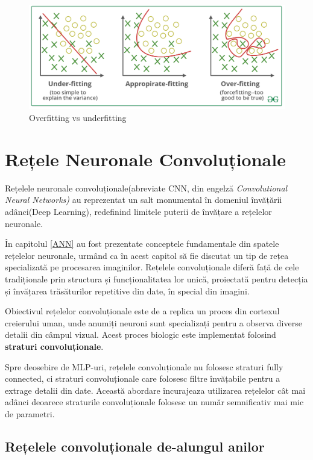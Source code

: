 \begin{figure}[h]
         \centering 
         \includegraphics[width=.85\linewidth]{images/under_vs_over.png}
         \captionsetup{font=footnotesize}
         \caption{Overfitting vs underfitting \cite{under_vs_over}}
\end{figure}


\newpage



\section{Rețele Neuronale Convoluționale}

Rețelele neuronale convoluționale(abreviate CNN, din engelză \textit{Convolutional Neural Networks)} au reprezentat un salt monumental în domeniul învățării adânci(Deep Learning), redefinind limitele puterii de învățare a rețelelor neuronale. 

În capitolul \ref{ANN} au fost prezentate conceptele fundamentale din spatele rețelelor neuronale, urmând ca în acest capitol să fie discutat un tip de rețea specializată pe procesarea imaginilor.
Rețelele convoluționale diferă față de cele tradiționale prin structura și funcționalitatea lor unică, proiectată pentru detecția și învățarea trăsăturilor repetitive din date, în special din imagini.

Obiectivul rețelelor convoluționale este de a replica un proces din cortexul creierului uman, unde anumiți neuroni sunt specializați pentru a observa diverse detalii din câmpul vizual. Acest proces biologic este implementat folosind \textbf{straturi convoluționale}. 

Spre deosebire de MLP-uri, rețelele convoluționale nu folosesc straturi fully connected, ci straturi convoluționale care folosesc filtre învățabile pentru a extrage detalii din date. Această abordare încurajeaza utilizarea rețelelor cât mai adânci deoarece straturile convoluționale folosesc un număr semnificativ mai mic de parametri.

\subsection{Rețelele convoluționale de-alungul anilor}

